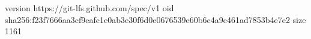 version https://git-lfs.github.com/spec/v1
oid sha256:f23f7666aa3cf9eafc1e0ab3e30f6d0e0676539e60b6c4a9e461ad7853b4e7e2
size 1161
